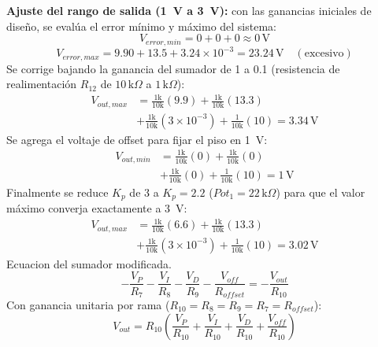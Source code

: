 \documentclass[conference]{IEEEtran}
\begin{document}
\textbf{Ajuste del rango de salida (1~V a 3~V):} con las ganancias iniciales de diseño, se evalúa el error mínimo y máximo del sistema:
\begin{equation}
V_{error,min}=0+0+0\approx 0\,\text{V}
\end{equation}
\begin{equation}
V_{error,max}=9.90+13.5+3.24\times10^{-3}=23.24\,\text{V} \quad(\text{excesivo})
\end{equation}
Se corrige bajando la ganancia del sumador de 1 a 0.1 (resistencia de realimentación $R_{12}$ de $10\,\text{k}\Omega$ a $1\,\text{k}\Omega$):
\begin{equation}
\begin{aligned}
V_{out,max}&=\tfrac{1\text{k}}{10\text{k}}(9.9)+\tfrac{1\text{k}}{10\text{k}}(13.3)\\
&+\tfrac{1\text{k}}{10\text{k}}(3\times10^{-3})+\tfrac{1}{10\text{k}}(10)=3.34\,\text{V}
\end{aligned}
\end{equation}
Se agrega el voltaje de offset para fijar el piso en 1~V:
\begin{equation}
\begin{aligned}
V_{out,min}&=\tfrac{1\text{k}}{10\text{k}}(0)+\tfrac{1\text{k}}{10\text{k}}(0)\\
&+\tfrac{1\text{k}}{10\text{k}}(0)+\tfrac{1}{10\text{k}}(10)=\boxed{1\,\text{V}}
\end{aligned}
\end{equation}
Finalmente se reduce $K_p$ de 3 a $K_p=2.2$ ($Pot_1=22\,\text{k}\Omega$) para que el valor máximo converja exactamente a 3~V:
\begin{equation}
\begin{aligned}
V_{out,max}&=\tfrac{1\text{k}}{10\text{k}}(6.6)+\tfrac{1\text{k}}{10\text{k}}(13.3)\\
&+\tfrac{1\text{k}}{10\text{k}}(3\times10^{-3})+\tfrac{1}{10\text{k}}(10)=\boxed{3.02\,\text{V}}
\end{aligned}
\end{equation}
Ecuacion del sumador modificada.
\begin{equation}
-\frac{V_P}{R_7}-\frac{V_I}{R_8}-\frac{V_D}{R_{9}}-\frac{V_{off}}{R_{offset}}=-\frac{V_{out}}{R_{10}}
\end{equation}
Con ganancia unitaria por rama ($R_{10}=R_8=R_9=R_{7}=R_{offset}$):
\begin{equation}
V_{out}=R_{10}\left(\frac{V_P}{R_{10}}+\frac{V_I}{R_{10}}+\frac{V_D}{R_{10}}+\frac{V_{off}}{R_{10}}\right)
\end{equation}
\end{document}
